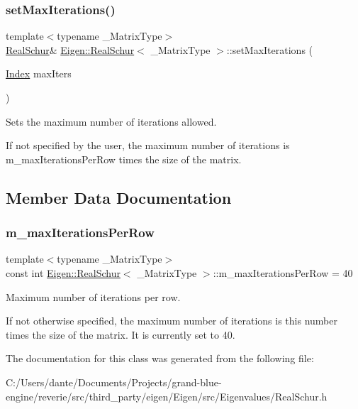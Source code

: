 \subsubsection{\texorpdfstring{setMaxIterations()}{setMaxIterations()}}
{\footnotesize\ttfamily template$<$typename \+\_\+\+Matrix\+Type$>$ \\
\mbox{\hyperlink{class_eigen_1_1_real_schur}{Real\+Schur}}\& \mbox{\hyperlink{class_eigen_1_1_real_schur}{Eigen\+::\+Real\+Schur}}$<$ \+\_\+\+Matrix\+Type $>$\+::set\+Max\+Iterations (\begin{DoxyParamCaption}\item[{\mbox{\hyperlink{class_eigen_1_1_real_schur_a8bd4653e2d9569a44ecc95e746422d3f}{Index}}}]{max\+Iters }\end{DoxyParamCaption})\hspace{0.3cm}{\ttfamily [inline]}}



Sets the maximum number of iterations allowed. 

If not specified by the user, the maximum number of iterations is m\+\_\+max\+Iterations\+Per\+Row times the size of the matrix. 

\subsection{Member Data Documentation}
\mbox{\label{class_eigen_1_1_real_schur_a5cf45fb60964a3e7ea3a6718a8d7acdf}} 
\subsubsection{\texorpdfstring{m\_maxIterationsPerRow}{m\_maxIterationsPerRow}}
{\footnotesize\ttfamily template$<$typename \+\_\+\+Matrix\+Type$>$ \\
const int \mbox{\hyperlink{class_eigen_1_1_real_schur}{Eigen\+::\+Real\+Schur}}$<$ \+\_\+\+Matrix\+Type $>$\+::m\+\_\+max\+Iterations\+Per\+Row = 40\hspace{0.3cm}{\ttfamily [static]}}



Maximum number of iterations per row. 

If not otherwise specified, the maximum number of iterations is this number times the size of the matrix. It is currently set to 40. 

The documentation for this class was generated from the following file\+:\begin{DoxyCompactItemize}
\item 
C\+:/\+Users/dante/\+Documents/\+Projects/grand-\/blue-\/engine/reverie/src/third\+\_\+party/eigen/\+Eigen/src/\+Eigenvalues/Real\+Schur.\+h\end{DoxyCompactItemize}

